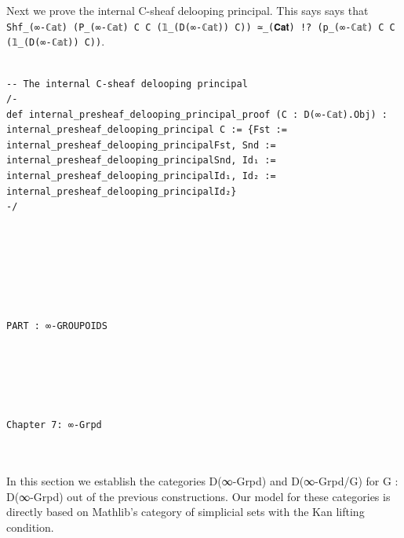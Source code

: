 \documentclass{book}
\theoremstyle{definition}
\newcounter{pcounter}
\newcounter{lcounter}
\renewcommand{\chapter}[1]{
\newpage
{
\Huge 
\begin{center}
\ \\
\ \\
\thispagestyle{empty}
\texttt{#1}
\end{center}}
\ \\
\ \\
}
\newcounter{partcount}
\renewcommand{\part}[1]{
\newpage
{
\Huge 
\begin{center}
\ \\
\ \\
\ \\
\ \\
\ \\
\ \\
\thispagestyle{empty}
\texttt{PART {\thepartcount}: #1}
\stepcounter{partcount}
\end{center}}
\ \\
\ \\
}
\begin{document}
{\begin{center}
\begin{tcolorbox}[width=5in,colback={white},title={\begin{center}\texttt{Lean \thelcounter} \addtocounter{lcounter}{1}  \end{center}},colbacktitle=Yellow,coltitle=black]
\begin{verbatim}
\end{verbatim}
\end{tcolorbox}
\end{center}

Next we prove the internal C-sheaf delooping principal. This says says that \texttt{Shf\_(∞-ℂ𝕒𝕥) (P\_(∞-ℂ𝕒𝕥) C C (𝟙\_(D(∞-ℂ𝕒𝕥)) C)) ≃\_(𝐂𝐚𝐭) !? (p\_(∞-ℂ𝕒𝕥) C C (𝟙\_(D(∞-ℂ𝕒𝕥)) C))}.\\

\begin{center}
\begin{tcolorbox}[width=5in,colback={white},title={\begin{center}\texttt{Lean \thelcounter} \addtocounter{lcounter}{1}  \end{center}},colbacktitle=Yellow,coltitle=black]
\begin{verbatim}

-- The internal C-sheaf delooping principal
/-
def internal_presheaf_delooping_principal_proof (C : D(∞-ℂ𝕒𝕥).Obj) : internal_presheaf_delooping_principal C := {Fst := internal_presheaf_delooping_principalFst, Snd := internal_presheaf_delooping_principalSnd, Id₁ := internal_presheaf_delooping_principalId₁, Id₂ := internal_presheaf_delooping_principalId₂}
-/

\end{verbatim}
\end{tcolorbox}
\end{center}





\part{∞-GROUPOIDS}
\newpage

\chapter{Chapter 7: ∞\texttt{-Grpd}}

In this section we establish the categories D(∞-Grpd) and D(∞-Grpd/G) for G : D(∞-Grpd) out of the previous constructions. Our model for these categories is directly based on Mathlib's category of simplicial sets with the Kan lifting condition.\\

\begin{center}
\begin{tcolorbox}[width=5in,colback={white},title={\begin{center}\texttt{Lean \thelcounter} \addtocounter{lcounter}{1}  \end{center}},colbacktitle=Blue,coltitle=black]
\begin{verbatim}


\end{verbatim}
\end{tcolorbox}
\end{center}}
\end{document}
